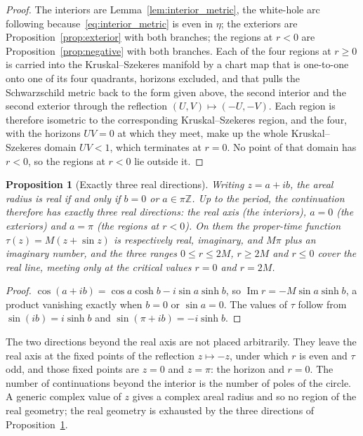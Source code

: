 \documentclass{iopjournal}
\theoremstyle{plain}
\newtheorem{proposition}[theorem]{Proposition}
\theoremstyle{remark}
\begin{document}
\begin{proof}
The interiors are Lemma~\ref{lem:interior_metric}, the white-hole arc following because~\eqref{eq:interior_metric} is even in $\eta$; the exteriors are Proposition~\ref{prop:exterior} with both branches; the regions at $r<0$ are Proposition~\ref{prop:negative} with both branches. Each of the four regions at $r\geq0$ is carried into the Kruskal--Szekeres manifold by a chart map that is one-to-one onto one of its four quadrants, horizons excluded, and that pulls the Schwarzschild metric back to the form given above, the second interior and the second exterior through the reflection $(U,V)\mapsto(-U,-V)$. Each region is therefore isometric to the corresponding Kruskal--Szekeres region, and the four, with the horizons $UV=0$ at which they meet, make up the whole Kruskal--Szekeres domain $UV<1$, which terminates at $r=0$. No point of that domain has $r<0$, so the regions at $r<0$ lie outside it.
\end{proof}

\begin{proposition}[Exactly three real directions]\label{prop:exhaustive}
Writing $z=a+ib$, the areal radius is real if and only if $b=0$ or $a\in\pi\mathbb{Z}$. Up to the period, the continuation therefore has exactly three real directions: the real axis (the interiors), $a=0$ (the exteriors) and $a=\pi$ (the regions at $r<0$). On them the proper-time function $\tau(z)=M(z+\sin z)$ is respectively real, imaginary, and $M\pi$ plus an imaginary number, and the three ranges $0\leq r\leq2M$, $r\geq2M$ and $r\leq0$ cover the real line, meeting only at the critical values $r=0$ and $r=2M$.
\end{proposition}

\begin{proof}
$\cos(a+ib)=\cos a\cosh b-i\sin a\sinh b$, so $\operatorname{Im}r=-M\sin a\sinh b$, a product vanishing exactly when $b=0$ or $\sin a=0$. The values of $\tau$ follow from $\sin(ib)=i\sinh b$ and $\sin(\pi+ib)=-i\sinh b$.
\end{proof}

The two directions beyond the real axis are not placed arbitrarily. They leave the real axis at the fixed points of the reflection $z\mapsto-z$, under which $r$ is even and $\tau$ odd, and those fixed points are $z=0$ and $z=\pi$: the horizon and $r=0$. The number of continuations beyond the interior is the number of poles of the circle. A generic complex value of $z$ gives a complex areal radius and so no region of the real geometry; the real geometry is exhausted by the three directions of Proposition~\ref{prop:exhaustive}.
\end{document}
